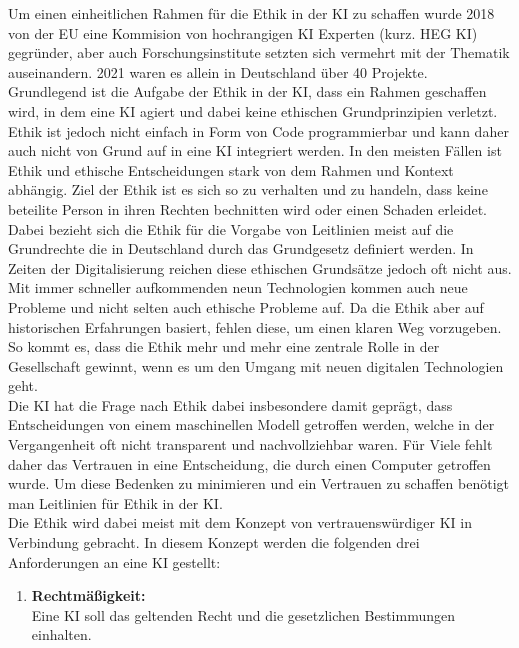 \begin{onehalfspace}
        Um einen einheitlichen Rahmen für die Ethik in der \ac*{KI} zu schaffen wurde 2018 von der EU eine Kommision von hochrangigen \ac*{KI} Experten (kurz. HEG KI) gegründer, aber auch Forschungsinstitute setzten sich vermehrt mit der Thematik auseinandern. 2021 waren es allein in Deutschland über 40 Projekte.\cite{Beckert2021}
        \\
        Grundlegend ist die Aufgabe der Ethik in der \ac*{KI}, dass ein Rahmen geschaffen wird, in dem eine \ac*{KI} agiert und dabei keine ethischen Grundprinzipien verletzt.\cite{Cremers2019} Ethik ist jedoch nicht einfach in Form von Code programmierbar und kann daher auch nicht von Grund auf in eine \ac*{KI} integriert werden. In den meisten Fällen ist Ethik und ethische Entscheidungen stark von dem Rahmen und Kontext abhängig. Ziel der Ethik ist es sich so zu verhalten und zu handeln, dass  keine beteilite Person in ihren Rechten bechnitten wird oder einen Schaden erleidet.\cite{Heesen2020}
        Dabei bezieht sich die Ethik für die Vorgabe von Leitlinien meist auf die Grundrechte die in Deutschland durch das Grundgesetz definiert werden. In Zeiten der Digitalisierung reichen diese ethischen Grundsätze jedoch oft nicht aus. Mit immer schneller aufkommenden neun Technologien kommen auch neue Probleme und nicht selten auch ethische Probleme auf. Da die Ethik aber auf historischen Erfahrungen basiert, fehlen diese, um einen klaren Weg vorzugeben. So kommt es, dass die Ethik mehr und mehr eine zentrale Rolle in der Gesellschaft gewinnt, wenn es um den Umgang mit neuen digitalen Technologien geht.\cite{Cremers2019} \\
        Die \ac*{KI} hat die Frage nach Ethik dabei insbesondere damit geprägt, dass Entscheidungen von einem maschinellen Modell getroffen werden, welche in der Vergangenheit oft nicht transparent und nachvollziehbar waren. Für Viele fehlt daher das Vertrauen in eine Entscheidung, die durch einen Computer getroffen wurde. Um diese Bedenken zu minimieren und ein Vertrauen zu schaffen benötigt man Leitlinien für Ethik in der \ac*{KI}.\cite{Heesen2020}
        \\
        Die Ethik wird dabei meist mit dem Konzept von vertrauenswürdiger \ac*{KI} in Verbindung gebracht. In diesem Konzept werden die folgenden drei Anforderungen an eine \ac*{KI} gestellt:
        \begin{enumerate}
            \item \textbf{Rechtmäßigkeit:} \\ Eine \ac*{KI} soll das geltenden Recht und die gesetzlichen Bestimmungen einhalten.

\end{enumerate}
\end{onehalfspace}
